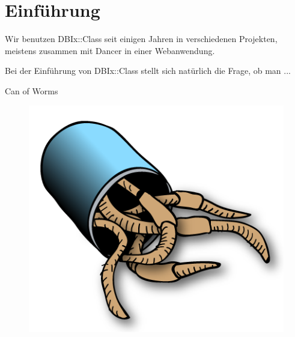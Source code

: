 
\maketitle

\begin{frame}
  \titlepage
\end{frame}

\cleardoublepage

\tableofcontents

\cleardoublepage

\section{Einführung}

Wir benutzen DBIx::Class seit einigen Jahren in verschiedenen
Projekten, meistens zusammen mit Dancer in einer Webanwendung.

Bei der Einführung von DBIx::Class stellt sich natürlich
die Frage, ob man ...

\begin{frame}{Can of Worms}
\begin{figure}[!ht]
\centering
\includegraphics[width=0.75\linewidth]{img/canofworms.png}
\end{figure}
\end{frame}

